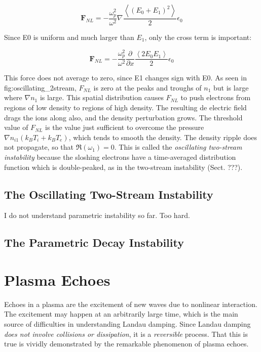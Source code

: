 \documentclass[
  notoc %
]{tufte-book}
\begin{document}
\[
\mathbf{F}_{NL} = -\frac{\omega_p^2}{\omega^2}\nabla\frac{\left< (E_0 + E_1)^2\right>}{2}\epsilon_0
\]

Since E0 is uniform and much larger than \(E_1\), only the cross term is
important:

\[
\mathbf{F}_{NL} = -\frac{\omega_p^2}{\omega^2}\frac{\partial}{\partial x}\frac{\left<2E_0E_1\right>}{2}\epsilon_0
\]

This force does not average to zero, since E1 changes sign with E0. As
seen in fig:oscillating\_2stream, \(F_{NL}\) is zero at the peaks and
troughs of \(n_1\) but is large where \(\nabla n_1\) is large. This
spatial distribution causes \(F_{NL}\) to push electrons from regions of
low density to regions of high density. The resulting de electric field
drags the ions along also, and the density perturbation grows. The
threshold value of \(F_{NL}\) is the value just sufficient to overcome
the pressure \(\nabla n_{i1}(k_BT_i + k_BT_e)\), which tends to smooth
the density. The density ripple does not propagate, so that
\(\Re(\omega_1)=0\). This is called the \emph{oscillating two-stream
instability} because the sloshing electrons have a time-averaged
distribution function which is double-peaked, as in the two-stream
instability (Sect. ???).

\hypertarget{the-oscillating-two-stream-instability}{%
\subsection{The Oscillating Two-Stream
Instability}\label{the-oscillating-two-stream-instability}}

I do not understand parametric instability so far. Too hard.

\hypertarget{the-parametric-decay-instability}{%
\subsection{The Parametric Decay
Instability}\label{the-parametric-decay-instability}}

\hypertarget{sec:echo}{%
\section{Plasma Echoes}\label{sec:echo}}

Echoes in a plasma are the excitement of new waves due to nonlinear
interaction. The excitement may happen at an arbitrarily large time,
which is the main source of difficulties in understanding Landau
damping. Since Landau damping \emph{does not involve collisions or
dissipation}, it is a \emph{reversible} process. That this is true is
vividly demonstrated by the remarkable phenomenon of plasma echoes.
\end{document}
